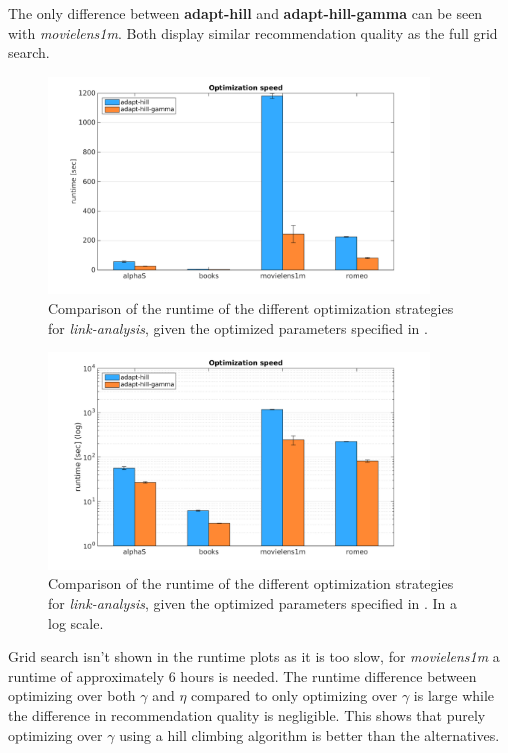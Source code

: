 The only difference between \textbf{adapt-hill} and \textbf{adapt-hill-gamma} can be seen with \textit{movielens1m}. Both display similar recommendation quality as the full grid search.

\begin{figure}[h!]
    \centering
    \includegraphics[width=0.9\textwidth]{fig/comp/comp_link_speed.png}
    \caption{Comparison of the runtime of the different optimization strategies for \textit{link-analysis}, given the optimized parameters specified in .}
\end{figure}

\begin{figure}[h!]
    \centering
    \includegraphics[width=0.9\textwidth]{fig/comp/comp_link_speed_log.png}
    \caption{Comparison of the runtime of the different optimization strategies for \textit{link-analysis}, given the optimized parameters specified in . In a log scale.}
\end{figure}

\FloatBarrier

Grid search isn't shown in the runtime plots as it is too slow, for \textit{movielens1m} a runtime of approximately 6 hours is needed.  The runtime difference between optimizing over both $\gamma$ and $\eta$ compared to only optimizing over $\gamma$ is large while the difference in recommendation quality is negligible. This shows that purely optimizing over $\gamma$ using a hill climbing algorithm is better than the alternatives.

